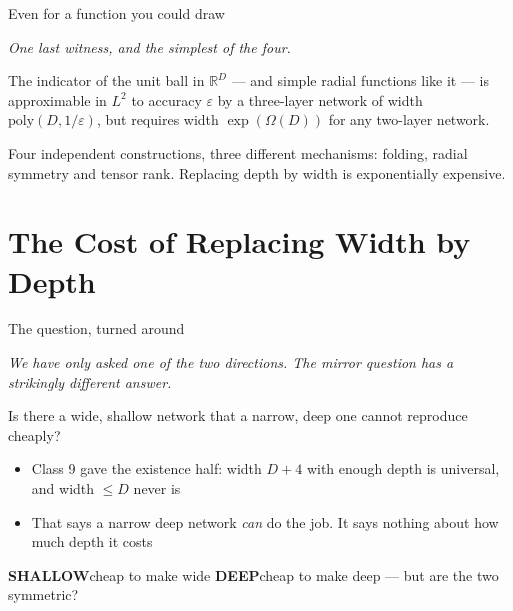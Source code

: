 \documentclass[aspectratio=169, 11pt]{beamer}
\newcommand{\shpar}[2]{%
  \vfill
  {\scriptsize
  \begin{tcolorbox}[enhanced, sidebyside, sidebyside align=top,
                    lefthand ratio=0.485,
                    segmentation style={shc!35, line width=0.6pt},
                    colback=shc!5, colframe=shc!35, boxrule=0.5pt,
                    arc=1.2mm, left=1.6mm, right=1.6mm,
                    top=0.6mm, bottom=0.6mm,
                    before skip=0pt, after skip=0pt]
    {\color{shc}\textbf{SHALLOW}}\hspace{0.55em}#1
  \tcblower
    {\color{dpc}\textbf{DEEP}}\hspace{0.55em}#2
  \end{tcolorbox}}%
  \vspace{0.35em}%
}
\newcommand{\bridge}[1]{%
  {\scriptsize\itshape\color{mcMuted} #1\par}\vspace{0.35em}}
\begin{document}
\begin{frame}{Even for a function you could draw}
  \bridge{One last witness, and the simplest of the four.}
  \vspace{0.4em}
  \begin{theorem}
    {\small The indicator of the unit ball in $\mathbb{R}^{D}$ ---
    and simple radial functions like it --- is approximable in $L^{2}$
    to accuracy $\varepsilon$ by a \alert{three-layer} network of width
    $\mathrm{poly}(D,1/\varepsilon)$, but requires width
    $\exp(\Omega(D))$ for any \alert{two-layer} network.}
  \end{theorem}
  \vspace{0.5em}
  \begin{redhighlight}
    {\small Four independent constructions, three different mechanisms:
    folding, radial symmetry and tensor rank. \alert{Replacing depth by
    width is exponentially expensive.}}
  \end{redhighlight}
\end{frame}

\section{The Cost of Replacing Width by Depth}

\begin{frame}{The question, turned around}
  \bridge{We have only asked one of the two directions. The mirror
  question has a strikingly different answer.}
  \vspace{0.5em}
  \begin{center}
    {\large Is there a \alert{wide, shallow} network that a
    \alert{narrow, deep} one cannot reproduce cheaply?}
  \end{center}
  \vspace{0.6em}
  {\small
  \begin{itemize}\setlength{\itemsep}{4pt}
    \item Class 9 gave the existence half: width $D+4$ with enough
          depth is universal, and width $\leq D$ never is
    \item That says a narrow deep network \emph{can} do the job. It
          says nothing about \alert{how much depth} it costs
  \end{itemize}}
  \shpar{cheap to make wide}
        {cheap to make deep --- but are the two symmetric?}
\end{frame}
\end{document}
